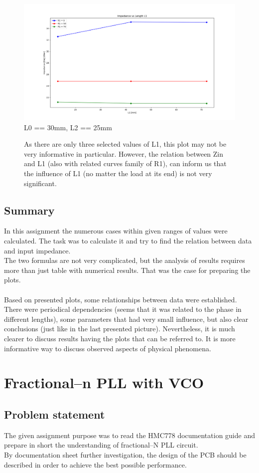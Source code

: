 \documentclass[eng,printmode]{mgr}
\begin{document}
\begin{figure}[!h]
	\centering
	\includegraphics[width=1\linewidth]{Figure_2}
	L0 == 30mm, L2 == 25mm
	\caption{As there are only three selected values of L1, this plot may not be very informative in particular. However, the relation between Zin and L1 (also with related curves family of R1), can inform us that the influence of L1 (no matter the load at its end) is not very significant.}
\end{figure}

\section{Summary}
In this assignment the numerous cases within given ranges of values were calculated. The task was to calculate it and try to find the relation between data and input impedance.\\
The two formulas are not very complicated, but the analysis of results requires more than just table with numerical results. That was the case for preparing the plots.\\
\\
Based on presented plots, some relationships between data were established. There were periodical dependencies (seems that it was related to the phase in different lengths), some parameters that had very small influence, but also clear conclusions (just like in the last presented picture).
Nevertheless, it is much clearer to discuss results having the plots that can be referred to. It is more informative way to discuss observed aspects of physical phenomena.

\chapter{Fractional--n PLL with VCO}
\section{Problem statement}
The given assignment purpose was to read the HMC778 documentation guide and prepare in short the understanding of fractional--N PLL circuit.\\
By documentation sheet further investigation, the design of the PCB should be described in order to achieve the best possible performance.
\end{document}
